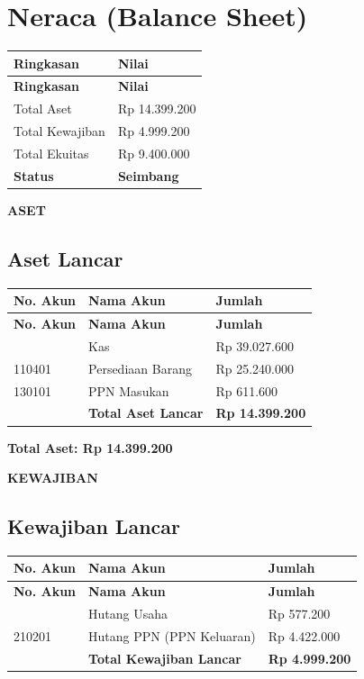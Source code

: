 \documentclass[11pt,a4paper]{article}
\begin{document}
\section{Neraca (Balance Sheet)}
{\setlength{\tabcolsep}{5pt}
\begin{longtable}{l R{3cm}}
\toprule
\textbf{Ringkasan} & \textbf{Nilai} \\
\midrule\endfirsthead
\toprule
\textbf{Ringkasan} & \textbf{Nilai} \\
\midrule\endhead
\bottomrule\endfoot
Total Aset & Rp 14.399.200 \\
Total Kewajiban & Rp 4.999.200 \\
Total Ekuitas & Rp 9.400.000 \\
\textbf{Status} & \textbf{Seimbang} \\
\end{longtable}}

\textbf{ASET}
\subsection{Aset Lancar}
{\setlength{\tabcolsep}{5pt}
\begin{longtable}{l l R{3cm}}
\toprule
\textbf{No. Akun} & \textbf{Nama Akun} & \textbf{Jumlah} \\
\midrule\endfirsthead
\toprule
\textbf{No. Akun} & \textbf{Nama Akun} & \textbf{Jumlah} \\
\midrule\endhead
\bottomrule{} & Kas & Rp 39.027.600 \\
110401 & Persediaan Barang & Rp 25.240.000 \\
130101 & PPN Masukan & Rp 611.600 \\
 & \textbf{Total Aset Lancar} & \textbf{Rp 14.399.200} \\
\end{longtable}}

\vspace{2pt}\noindent\colorbox{soft}{\parbox{\dimexpr\linewidth-2\fboxsep}{\textbf{Total Aset: Rp 14.399.200}}}\vspace{4pt}

\textbf{KEWAJIBAN}
\subsection{Kewajiban Lancar}
{\setlength{\tabcolsep}{5pt}
\begin{longtable}{l l R{3cm}}
\toprule
\textbf{No. Akun} & \textbf{Nama Akun} & \textbf{Jumlah} \\
\midrule\endfirsthead
\toprule
\textbf{No. Akun} & \textbf{Nama Akun} & \textbf{Jumlah} \\
\midrule\endhead
\bottomrule{} & Hutang Usaha & Rp 577.200 \\
210201 & Hutang PPN (PPN Keluaran) & Rp 4.422.000 \\
 & \textbf{Total Kewajiban Lancar} & \textbf{Rp 4.999.200} \\
\end{longtable}}
\end{document}
